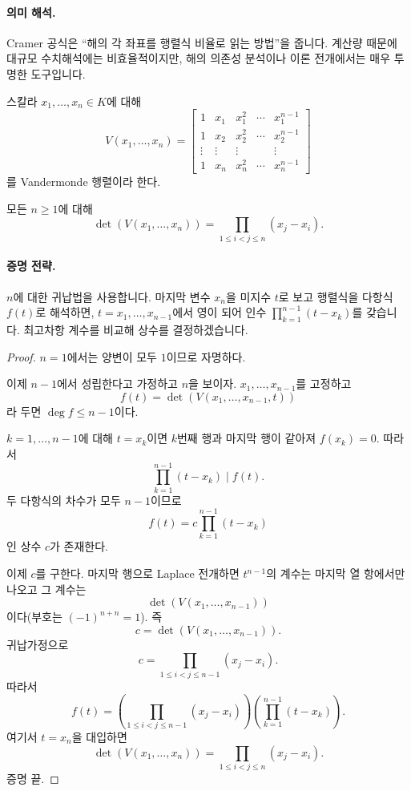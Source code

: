 \paragraph{의미 해석.}
Cramer 공식은 ``해의 각 좌표를 행렬식 비율로 읽는 방법''을 줍니다. 계산량 때문에 대규모 수치해석에는 비효율적이지만, 해의 의존성 분석이나 이론 전개에서는 매우 투명한 도구입니다.

\begin{definition}
스칼라 $x_1,\dots,x_n\in K$에 대해
$$
V(x_1,\dots,x_n)=
\begin{bmatrix}
1&x_1&x_1^2&\cdots&x_1^{n-1}\\
1&x_2&x_2^2&\cdots&x_2^{n-1}\\
\vdots&\vdots&\vdots&&\vdots\\
1&x_n&x_n^2&\cdots&x_n^{n-1}
\end{bmatrix}
$$
를 Vandermonde 행렬이라 한다.
\end{definition}

\begin{theorem}
모든 $n\ge1$에 대해
$$
\det(V(x_1,\dots,x_n))=\prod_{1\le i<j\le n}(x_j-x_i).
$$
\end{theorem}

\paragraph{증명 전략.}
$n$에 대한 귀납법을 사용합니다. 마지막 변수 $x_n$을 미지수 $t$로 보고 행렬식을 다항식 $f(t)$로 해석하면, $t=x_1,\dots,x_{n-1}$에서 영이 되어 인수 $\prod_{k=1}^{n-1}(t-x_k)$를 갖습니다. 최고차항 계수를 비교해 상수를 결정하겠습니다.

\begin{proof}
$n=1$에서는 양변이 모두 $1$이므로 자명하다.

이제 $n-1$에서 성립한다고 가정하고 $n$을 보이자. $x_1,\dots,x_{n-1}$를 고정하고
$$
f(t)=\det(V(x_1,\dots,x_{n-1},t))
$$
라 두면 $\deg f\le n-1$이다.

$k=1,\dots,n-1$에 대해 $t=x_k$이면 $k$번째 행과 마지막 행이 같아져 $f(x_k)=0$. 따라서
$$
\prod_{k=1}^{n-1}(t-x_k)\mid f(t).
$$
두 다항식의 차수가 모두 $n-1$이므로
$$
f(t)=c\prod_{k=1}^{n-1}(t-x_k)
$$
인 상수 $c$가 존재한다.

이제 $c$를 구한다. 마지막 행으로 Laplace 전개하면 $t^{n-1}$의 계수는 마지막 열 항에서만 나오고 그 계수는
$$
\det(V(x_1,\dots,x_{n-1}))
$$
이다(부호는 $(-1)^{n+n}=1$). 즉
$$
c=\det(V(x_1,\dots,x_{n-1})).
$$
귀납가정으로
$$
c=\prod_{1\le i<j\le n-1}(x_j-x_i).
$$
따라서
$$
f(t)=\left(\prod_{1\le i<j\le n-1}(x_j-x_i)\right)\left(\prod_{k=1}^{n-1}(t-x_k)\right).
$$
여기서 $t=x_n$을 대입하면
$$
\det(V(x_1,\dots,x_n))
=\prod_{1\le i<j\le n}(x_j-x_i).
$$
증명 끝.
\end{proof}

